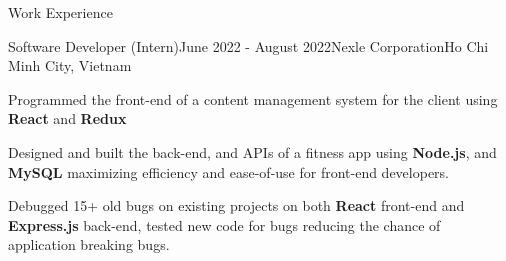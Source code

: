 \documentclass[
	11pt, %
]{resume} %
\begin{document}
\begin{rSection}{Work Experience}

	\begin{rSubsection}{Software Developer (Intern)}{June 2022 - August 2022}{Nexle Corporation}{Ho Chi Minh City, Vietnam}
		\item Programmed the front-end of a content management system for the client using \textbf{React} and \textbf{Redux}
		\item Designed and built the back-end, and APIs of a fitness app using \textbf{Node.js}, and \textbf{MySQL} maximizing efficiency and ease-of-use for front-end developers.
		\item Debugged 15+ old bugs on existing projects on both \textbf{React} front-end and \textbf{Express.js} back-end, tested new code for bugs reducing the chance of application breaking bugs.
	\end{rSubsection}

\end{rSection}

%
%







\end{document}
